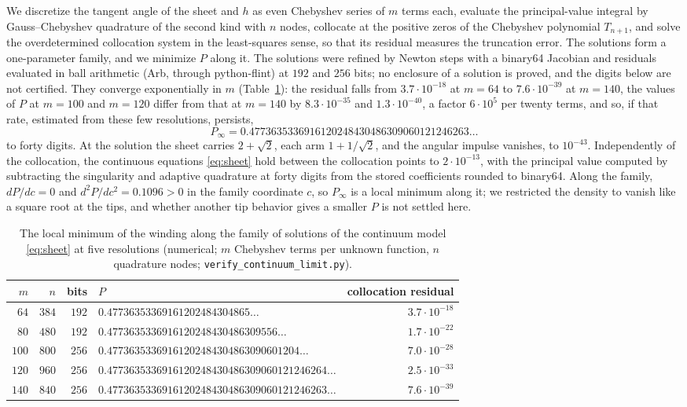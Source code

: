\documentclass[11pt]{article}
\theoremstyle{definition}
\begin{document}
We discretize the tangent angle of the sheet and $h$ as even Chebyshev series of $m$ terms each, evaluate the principal-value integral by Gauss--Chebyshev quadrature of the second kind with $n$ nodes, collocate at the positive zeros of the Chebyshev polynomial $T_{n+1}$, and solve the overdetermined collocation system in the least-squares sense, so that its residual measures the truncation error. The solutions form a one-parameter family, and we minimize $P$ along it. The solutions were refined by Newton steps with a binary64 Jacobian and residuals evaluated in ball arithmetic (Arb, through python-flint) at $192$ and $256$ bits; no enclosure of a solution is proved, and the digits below are not certified. They converge exponentially in $m$ (Table~\ref{tab:continuum}): the residual falls from $3.7 \cdot 10^{-18}$ at $m = 64$ to $7.6 \cdot 10^{-39}$ at $m = 140$, the values of $P$ at $m = 100$ and $m = 120$ differ from that at $m = 140$ by $8.3 \cdot 10^{-35}$ and $1.3 \cdot 10^{-40}$, a factor $6 \cdot 10^5$ per twenty terms, and so, if that rate, estimated from these few resolutions, persists,
\[
  P_\infty = 0.4773635336916120248430486309060121246263\ldots
\]
to forty digits. At the solution the sheet carries $2 + \sqrt{2}$, each arm $1 + 1/\sqrt{2}$, and the angular impulse vanishes, to $10^{-43}$. Independently of the collocation, the continuous equations \eqref{eq:sheet} hold between the collocation points to $2 \cdot 10^{-13}$, with the principal value computed by subtracting the singularity and adaptive quadrature at forty digits from the stored coefficients rounded to binary64. Along the family, $dP/dc = 0$ and $d^2P/dc^2 = 0.1096 > 0$ in the family coordinate $c$, so $P_\infty$ is a local minimum along it; we restricted the density to vanish like a square root at the tips, and whether another tip behavior gives a smaller $P$ is not settled here.

\begin{table}[t]
\centering
\small
\renewcommand{\arraystretch}{1.12}
\begin{tabular}{@{}rrrlr@{}}
\toprule
$m$ & $n$ & bits & $P$ & collocation residual \\
\midrule
$64$ & $384$ & $192$ & $0.47736353369161202484304865\ldots$ & $3.7 \cdot 10^{-18}$ \\
$80$ & $480$ & $192$ & $0.4773635336916120248430486309556\ldots$ & $1.7 \cdot 10^{-22}$ \\
$100$ & $800$ & $256$ & $0.47736353369161202484304863090601204\ldots$ & $7.0 \cdot 10^{-28}$ \\
$120$ & $960$ & $256$ & $0.4773635336916120248430486309060121246264\ldots$ & $2.5 \cdot 10^{-33}$ \\
$140$ & $840$ & $256$ & $0.4773635336916120248430486309060121246263\ldots$ & $7.6 \cdot 10^{-39}$ \\
\bottomrule
\end{tabular}
\caption{The local minimum of the winding along the family of solutions of the continuum model \eqref{eq:sheet} at five resolutions (numerical; $m$ Chebyshev terms per unknown function, $n$ quadrature nodes; \texttt{verify\_\allowbreak continuum\_\allowbreak limit.py}).}\label{tab:continuum}
\end{table}
\end{document}
